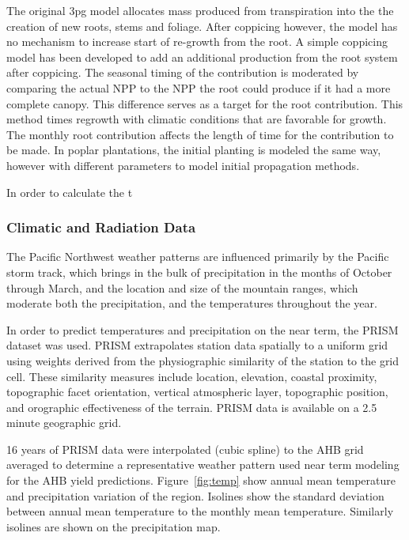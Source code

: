 \documentclass[preprint,12pt]{elsarticle}
\begin{document}
The original \ac{3pg} model allocates mass produced from transpiration
into the the creation of new roots, stems and foliage.  After
coppicing however, the model has no mechanism to increase start of
re-growth from the root.  A simple coppicing model has been developed
to add an additional production from the root system after
coppicing\cite{hart14-coppice}.  The seasonal timing of the
contribution is moderated by comparing the actual \ac{NPP} to the
\ac{NPP} the root could produce if it had a more complete canopy.
This difference serves as a target for the root contribution.  This
method times regrowth with climatic conditions that are favorable for
growth.  The monthly root contribution affects the length of time for
the contribution to be made.  In poplar plantations, the initial
planting is modeled the same way, however with different parameters to
model initial propagation methods.

In order to calculate the t

\subsubsection{Climatic and Radiation Data}
\label{sec:climate}


The Pacific Northwest weather patterns are influenced primarily by the
Pacific storm track, which brings in the bulk of precipitation in the
months of October through March, and the location and size of the
mountain ranges, which moderate both the precipitation, and the
temperatures throughout the year.

In order to predict temperatures and precipitation on the near term,
the \acf{PRISM} dataset was used.  \ac{PRISM} extrapolates station
data spatially to a uniform grid using weights derived from the
physiographic similarity of the station to the grid cell. These
similarity measures include location, elevation, coastal proximity,
topographic facet orientation, vertical atmospheric layer, topographic
position, and orographic effectiveness of the terrain.  \ac{PRISM}
data is available on a 2.5 minute geographic grid.

16 years of \ac{PRISM} data were interpolated (cubic spline) to the
\ac{AHB} grid averaged to determine a representative weather pattern
used near term modeling for the \ac{AHB} yield predictions.
Figure~\ref{fig:temp} show annual mean temperature and precipitation
variation of the region.  Isolines show the standard deviation between
annual mean temperature to the monthly mean temperature.  Similarly
isolines are shown on the precipitation map.
\end{document}
